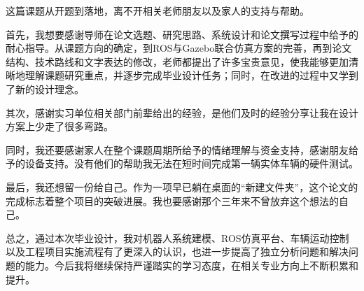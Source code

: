 \begin{acknowledgements}

这篇课题从开题到落地，离不开相关老师朋友以及家人的支持与帮助。

首先，我想要感谢导师在论文选题、研究思路、系统设计和论文撰写过程中给予的耐心指导。从课题方向的确定，到ROS与Gazebo联合仿真方案的完善，再到论文结构、技术路线和文字表达的修改，老师都提出了许多宝贵意见，使我能够更加清晰地理解课题研究重点，并逐步完成毕业设计任务；同时，在改进的过程中又学到了新的设计理念。

其次，感谢实习单位相关部门前辈给出的经验，是他们及时的经验分享让我在设计方案上少走了很多弯路。

同时，我还要感谢家人在整个课题周期所给予的情绪理解与资金支持，感谢朋友给予的设备支持。没有他们的帮助我无法在短时间完成第一辆实体车辆的硬件测试。

最后，我还想留一份给自己。作为一项早已躺在桌面的``新建文件夹''，这个论文的完成标志着整个项目的突破进展。我也要感谢那个三年来不曾放弃这个想法的自己。

总之，通过本次毕业设计，我对机器人系统建模、ROS仿真平台、车辆运动控制以及工程项目实施流程有了更深入的认识，也进一步提高了独立分析问题和解决问题的能力。今后我将继续保持严谨踏实的学习态度，在相关专业方向上不断积累和提升。

\end{acknowledgements}
